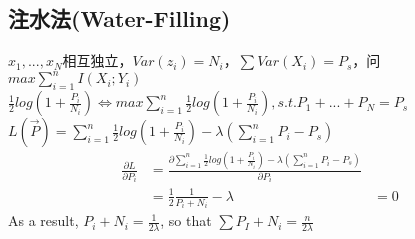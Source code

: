 \documentclass[a4paper, 12pt]{article}
\begin{document}
    \subsection{注水法(Water-Filling)}
    $x_1,...,x_N$相互独立，$Var(z_i)=N_i$，$\sum Var(X_i)=P_s$，问$max\sum_{i=1}^nI(X_i;Y_i)$
    \newline $\frac{1}{2}log(1+\frac{P_i}{N_i})\Leftrightarrow max\sum_{i=1}^n\frac{1}{2}log(1+\frac{P_i}{N_i}), s.t. P_1+...+P_N=P_s$
    \newline $L(\vec{P})=\sum_{i=1}^n\frac{1}{2}log(1+\frac{P_i}{N_i})-\lambda(\sum_{i=1}^nP_i-P_s)$
    \begin{equation}
        \begin{aligned}
            \frac{\partial L}{\partial P_i}&=\frac{\partial \sum_{i=1}^n\frac{1}{2}log(1+\frac{P_i}{N_i})-\lambda(\sum_{i=1}^nP_i-P_s)}{\partial P_i}\\
            &=\frac{1}{2}\frac{1}{P_i+N_i}-\lambda
            &=0
        \end{aligned}
    \end{equation}
    As a result, $P_i+N_i=\frac{1}{2\lambda}$, so that $\sum P_I+N_i = \frac{n}{2 \lambda}$
\end{document}
